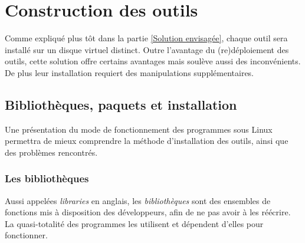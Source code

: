 
\section{Construction des outils}

Comme expliqué plus tôt dans la partie \ref{Solution envisagée}, chaque outil sera installé sur un disque virtuel distinct.
Outre l'avantage du (re)déploiement des outils, cette solution offre certains avantages mais soulève aussi des inconvénients.
De plus leur installation requiert des manipulations supplémentaires.
\\





\subsection{Bibliothèques, paquets et installation}
\label{Bibliothèques, paquets et installation}

Une présentation du mode de fonctionnement des programmes sous Linux permettra de mieux comprendre la méthode d'installation des outils, ainsi que des problèmes rencontrés.
\\




\subsubsection{Les bibliothèques}

Aussi appelées \textit{libraries} en anglais, les \textit{bibliothèques} sont des ensembles de fonctions mis à disposition des développeurs, afin de ne pas avoir à les réécrire.
La quasi-totalité des programmes les utilisent et dépendent d'elles pour fonctionner.
\\


